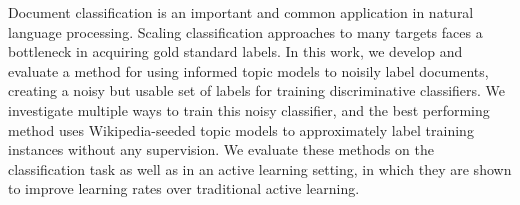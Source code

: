 Document classification is an important and common application in natural language processing. Scaling classification approaches to many targets faces a bottleneck in acquiring gold standard labels. In this work, we develop and evaluate a method for using informed topic models to noisily label documents, creating a noisy but usable set of labels for training discriminative classifiers. We investigate multiple ways to train this noisy classifier, and the best performing method uses Wikipedia-seeded topic models to approximately label training instances without any supervision. We evaluate these methods on the classification task as well as in an active learning setting, in which they are shown to improve learning rates over traditional active learning.
